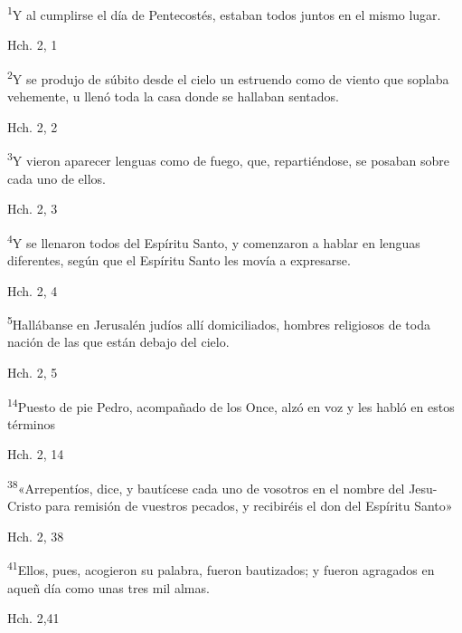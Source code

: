 \documentclass[a4paper,11pt]{article}
\begin{document}
      \textsuperscript{1}Y al cumplirse el día de Pentecostés, estaban todos juntos en el mismo lugar.
      \begin{flushright}
        Hch. 2, 1
      \end{flushright}

      \textsuperscript{2}Y se produjo de súbito desde el cielo un estruendo como de viento que soplaba vehemente, u llenó toda la casa
      donde se hallaban sentados.
      \begin{flushright}
        Hch. 2, 2
      \end{flushright}

      \textsuperscript{3}Y vieron aparecer lenguas como de fuego, que, repartiéndose, se posaban sobre cada uno de ellos.
      \begin{flushright}
        Hch. 2, 3
      \end{flushright}

      \textsuperscript{4}Y se llenaron todos del Espíritu Santo, y comenzaron a hablar en lenguas diferentes, según que el Espíritu Santo les movía
      a expresarse.
      \begin{flushright}
        Hch. 2, 4
      \end{flushright}

      \textsuperscript{5}Hallábanse en Jerusalén judíos allí domiciliados, hombres religiosos de toda nación de las que están debajo del cielo.
      \begin{flushright}
        Hch. 2, 5
      \end{flushright}

      \textsuperscript{14}Puesto de pie Pedro, acompañado de los Once, alzó en voz y les habló en estos términos
      \begin{flushright}
        Hch. 2, 14
      \end{flushright}

      \textsuperscript{38}«Arrepentíos, dice, y bautícese cada uno de vosotros en el nombre del Jesu-Cristo para remisión de vuestros pecados, y recibiréis el don
      del Espíritu Santo»
      \begin{flushright}
        Hch. 2, 38
      \end{flushright}

      \textsuperscript{41}Ellos, pues, acogieron su palabra, fueron bautizados; y fueron agragados en aqueñ día como unas tres mil almas.
      \begin{flushright}
        Hch. 2,41
      \end{flushright}
\end{document}
